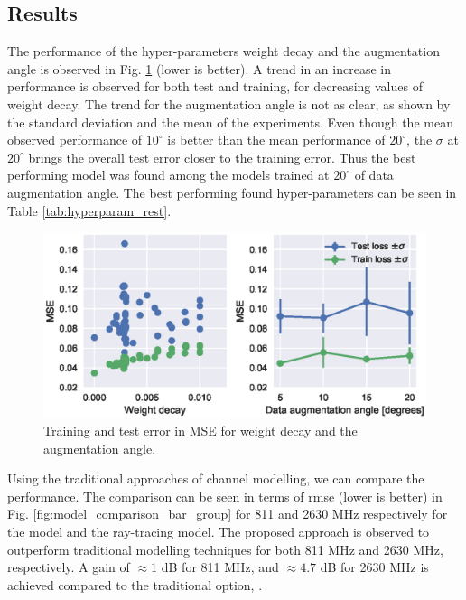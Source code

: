 \subsection{Results}

The performance of the hyper-parameters weight decay and the augmentation angle is observed in Fig. \ref{fig:hyperparameters_weight_decay} (lower is better). A trend in an increase in performance is observed for both test and training, for decreasing values of weight decay. The trend for the augmentation angle is not as clear, as shown by the standard deviation and the mean of the experiments. Even though the mean observed performance of $10^{\circ}$ is better than the mean performance of $20^{\circ}$, the $\sigma$ at $20^{\circ}$ brings the overall test error closer to the training error. Thus the best performing model was found among the models trained at $20^{\circ}$ of data augmentation angle. The best performing found hyper-parameters can be seen in Table \ref{tab:hyperparam_rest}.

\begin{figure}
    \centering
    \includegraphics{chapters/part_pathloss/model_aided_paper/hyperparameters_grayscale.eps}
    \caption{Training and test error in MSE for weight decay and the augmentation angle.}
    \label{fig:hyperparameters_weight_decay}
\end{figure}


Using the traditional approaches of channel modelling, we can compare the performance. The comparison can be seen in terms of \gls{rmse} (lower is better) in Fig. \ref{fig:model_comparison_bar_group} for 811 and 2630 MHz respectively for the  model and the ray-tracing model. The proposed approach is observed to outperform traditional modelling techniques for both 811 MHz and 2630 MHz, respectively. A gain of $\approx 1$ dB for 811 MHz, and $\approx 4.7$ dB for 2630 MHz is achieved compared to the traditional option, . 


